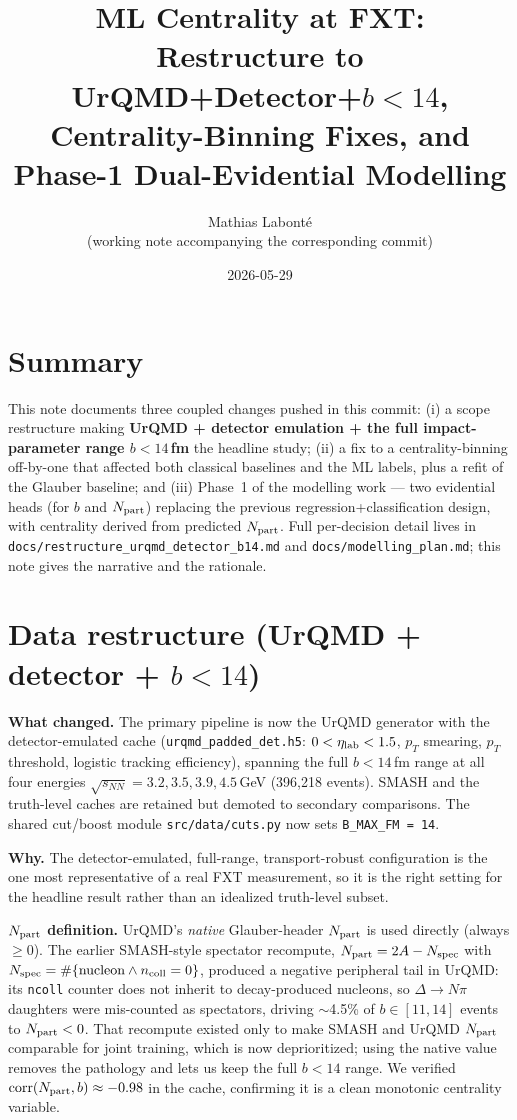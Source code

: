 \documentclass[11pt]{article}
\title{\vspace{-1.5em}ML Centrality at FXT: Restructure to UrQMD+Detector+$b<14$,\\
Centrality-Binning Fixes, and Phase-1 Dual-Evidential Modelling}
\author{Mathias Labont\'e \\ \small (working note accompanying the corresponding commit)}
\date{2026-05-29}
\newcommand{\snn}{\sqrt{s_{NN}}}
\newcommand{\code}[1]{\texttt{#1}}
\begin{document}
\maketitle
\vspace{-1.5em}

\section{Summary}
This note documents three coupled changes pushed in this commit: (i) a scope
restructure making \textbf{UrQMD + detector emulation + the full impact-parameter
range $b<14$\,fm} the headline study; (ii) a fix to a centrality-binning
off-by-one that affected both classical baselines and the ML labels, plus a
refit of the Glauber baseline; and (iii) Phase~1 of the modelling work --- two
evidential heads (for $b$ and $N_{\rm part}$) replacing the previous
regression+classification design, with centrality derived from predicted
$N_{\rm part}$. Full per-decision detail lives in
\code{docs/restructure\_urqmd\_detector\_b14.md} and \code{docs/modelling\_plan.md};
this note gives the narrative and the rationale.

\section{Data restructure (UrQMD + detector + $b<14$)}
\textbf{What changed.} The primary pipeline is now the UrQMD generator with the
detector-emulated cache (\code{urqmd\_padded\_det.h5}: $0<\eta_{\rm lab}<1.5$,
$p_T$ smearing, $p_T$ threshold, logistic tracking efficiency), spanning the full
$b<14$\,fm range at all four energies $\snn = 3.2, 3.5, 3.9, 4.5$\,GeV
(396{,}218 events). SMASH and the truth-level caches are retained but demoted to
secondary comparisons. The shared cut/boost module \code{src/data/cuts.py} now
sets \code{B\_MAX\_FM = 14}.

\textbf{Why.} The detector-emulated, full-range, transport-robust configuration is
the one most representative of a real FXT measurement, so it is the right setting
for the headline result rather than an idealized truth-level subset.

\textbf{$N_{\rm part}$ definition.} UrQMD's \emph{native} Glauber-header
$N_{\rm part}$ is used directly (always $\geq 0$). The earlier SMASH-style
spectator recompute, $N_{\rm part} = 2A - N_{\rm spec}$ with
$N_{\rm spec}=\#\{\text{nucleon} \wedge n_{\rm coll}=0\}$, produced a negative
peripheral tail in UrQMD: its \code{ncoll} counter does not inherit to
decay-produced nucleons, so $\Delta\!\to\!N\pi$ daughters were mis-counted as
spectators, driving $\sim$4.5\% of $b\in[11,14]$ events to $N_{\rm part}<0$. That
recompute existed only to make SMASH and UrQMD $N_{\rm part}$ comparable for joint
training, which is now deprioritized; using the native value removes the
pathology and lets us keep the full $b<14$ range. We verified
$\mathrm{corr}(N_{\rm part}, b)\approx-0.98$ in the cache, confirming it is a
clean monotonic centrality variable.
\end{document}
